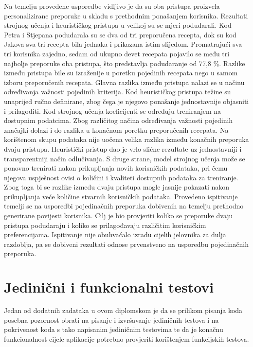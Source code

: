 \documentclass[diplomskirad]{fer}
\begin{document}
Na temelju provedene usporedbe vidljivo je da su oba pristupa proizvela personalizirane preporuke u skladu s prethodnim ponašanjem korisnika. Rezultati strojnog učenja i heurističkog pristupa u velikoj su se mjeri podudarali. Kod Petra i Stjepana podudarala su se dva od tri preporučena recepta, dok su kod Jakova sva tri recepta bila jednaka i prikazana istim slijedom. Promatrajući sva tri korisnika zajedno, sedam od ukupno devet recepata pojavilo se među tri najbolje preporuke oba pristupa, što predstavlja podudaranje od 77,8 \%. Razlike između pristupa bile su izraženije u poretku pojedinih recepata nego u samom izboru preporučenih recepata. Glavna razlika između pristupa nalazi se u načinu određivanja važnosti pojedinih kriterija. Kod heurističkog pristupa težine su unaprijed ručno definirane, zbog čega je njegovo ponašanje jednostavnije objasniti i prilagoditi. Kod strojnog učenja koeficijenti se određuju treniranjem na dostupnim podatcima. Zbog različitog načina određivanja važnosti pojedinih značajki dolazi i do razlika u konačnom poretku preporučenih recepata. Na korištenom skupu podataka nije uočena velika razlika između konačnih preporuka dvaju pristupa. Heuristički pristup dao je vrlo slične rezultate uz jednostavniji i transparentniji način odlučivanja. S druge strane, model strojnog učenja može se ponovno trenirati nakon prikupljanja novih korisničkih podataka, pri čemu njegova uspješnost ovisi o količini i kvaliteti dostupnih podataka za treniranje. Zbog toga bi se razlike između dvaju pristupa mogle jasnije pokazati nakon prikupljanja veće količine stvarnih korisničkih podataka. Provedeno ispitivanje temelji se na usporedbi pojedinačnih preporuka dobivenih na temelju prethodno generirane povijesti korisnika. Cilj je bio provjeriti koliko se preporuke dvaju pristupa podudaraju i koliko se prilagođavaju različitim korisničkim preferencijama. Ispitivanje nije obuhvaćalo izradu cijelih jelovnika za dulja razdoblja, pa se dobiveni rezultati odnose prvenstveno na usporedbu pojedinačnih preporuka.




\section{Jedinični i funkcionalni testovi}

Jedan od dodatnih zadataka u ovom diplomskom je da se prilikom pisanja koda posebna pozornost obrati na pisanje i izvršavanje jediničnih testova i na pokrivenost koda s tako napisanim jediničnim testovima te da je konačnu funkcionalnost cijele aplikacije potrebno provjeriti korištenjem funkcijskih testova. 
\end{document}
